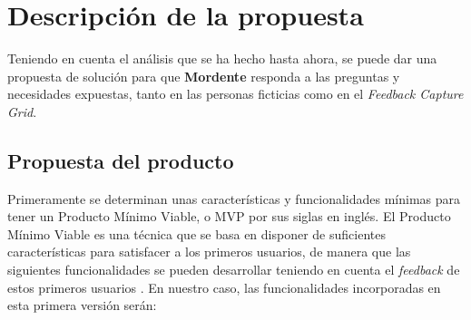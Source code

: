 \section{Descripción de la propuesta}\label{section:descripcionPropuesta}

Teniendo en cuenta el análisis que se ha hecho hasta ahora, se puede dar una propuesta de solución para que \textbf{Mordente} responda a las preguntas y necesidades expuestas, tanto en las personas ficticias como en el \textit{Feedback Capture Grid}.

\subsection{Propuesta del producto}

Primeramente se determinan unas características y funcionalidades mínimas para tener un Producto Mínimo Viable, o MVP por sus siglas en inglés. El Producto Mínimo Viable es una técnica que se basa en disponer de suficientes características para satisfacer a los primeros usuarios, de manera que las siguientes funcionalidades se pueden desarrollar teniendo en cuenta el \textit{feedback} de estos primeros usuarios \cite{mvp}. En nuestro caso, las funcionalidades incorporadas en esta primera versión serán:

